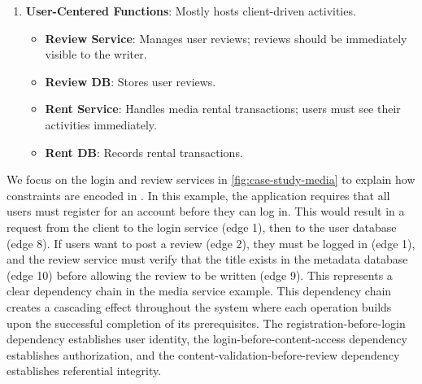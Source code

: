 \begin{enumerate}[leftmargin=*,noitemsep,topsep=2pt]
  \item \textbf{User-Centered Functions}: Mostly hosts client-driven activities. 
    \begin{itemize}[leftmargin=*, noitemsep,topsep=0pt]
      \item \textbf{Review Service}: Manages user reviews; reviews should be immediately visible to the writer.
      \item \textbf{Review DB}: Stores user reviews.
      \item \textbf{Rent Service}: Handles media rental transactions;
        users must see their activities immediately.
      \item \textbf{Rent DB}: Records rental transactions.
    \end{itemize}
\end{enumerate}

We focus on the login and review services in \cref{fig:case-study-media}
to explain how constraints are encoded in \sysname{}.
In this example, the application requires that all users must register for
an account before they can log in. This would result in a request from the
client to the login service (edge 1), then to the user database (edge 8).
If users want to post a review (edge 2), they must
be logged in (edge 1), and the review service must verify that the
title exists
in the metadata database (edge 10) before allowing the review to be
written (edge 9).
This represents a clear dependency chain in the media service example.
This dependency chain creates a cascading effect throughout the system
where each operation builds upon the successful completion of its
prerequisites.
The registration-before-login dependency establishes user identity,
the login-before-content-access dependency establishes authorization,
and the content-validation-before-review dependency establishes
referential integrity.


